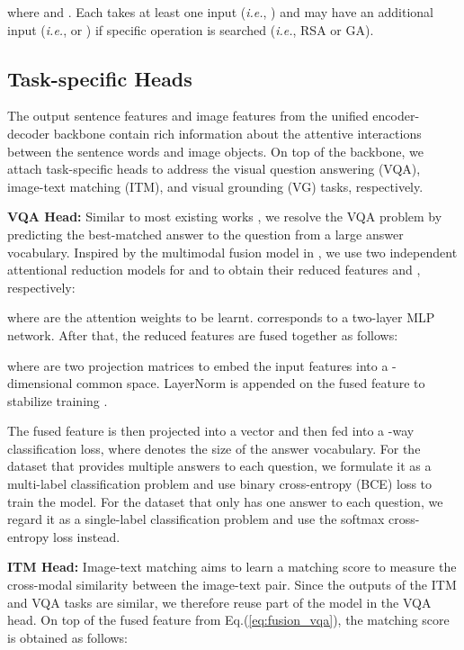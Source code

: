 \documentclass[sigconf]{acmart}
\begin{document}
where  and . Each  takes at least one input (\emph{i.e.}, ) and may have an additional input (\emph{i.e.},  or ) if specific operation is searched (\emph{i.e.}, \textsf{RSA} or \textsf{GA}).

\subsection{Task-specific Heads}
The output sentence features  and image features  from the unified encoder-decoder backbone contain rich information about the attentive interactions between the sentence words and image objects. On top of the backbone, we attach task-specific heads to address the visual question answering (VQA), image-text matching (ITM), and visual grounding (VG) tasks, respectively.

\noindent\textbf{VQA Head:} Similar to most existing works \cite{antol2015vqa,yu2017mfb,kim2018bilinear}, we resolve the VQA problem by predicting the best-matched answer to the question from a large answer vocabulary. Inspired by the multimodal fusion model in \cite{yu2019mcan}, we use two independent attentional reduction models for  and  to obtain their reduced features  and , respectively:

where  are the attention weights to be learnt.  corresponds to a two-layer MLP network. After that, the reduced features are fused together as follows:

where  are two projection matrices to embed the input features into a -dimensional common space. LayerNorm is appended on the fused feature to stabilize training \cite{ba2016layer}.

The fused feature  is then projected into a vector  and then fed into a -way classification loss, where  denotes the size of the answer vocabulary. For the dataset that provides multiple answers to each question, we formulate it as a multi-label classification problem and use binary cross-entropy (BCE) loss to train the model. For the dataset that only has one answer to each question, we regard it as a single-label classification problem and use the softmax cross-entropy loss instead.

\noindent\textbf{ITM Head:} Image-text matching aims to learn a matching score to measure the cross-modal similarity between the image-text pair. Since the outputs of the ITM and VQA tasks are similar, we therefore reuse part of the model in the VQA head. On top of the fused feature  from Eq.(\ref{eq:fusion_vqa}), the matching score  is obtained as follows:
\end{document}

